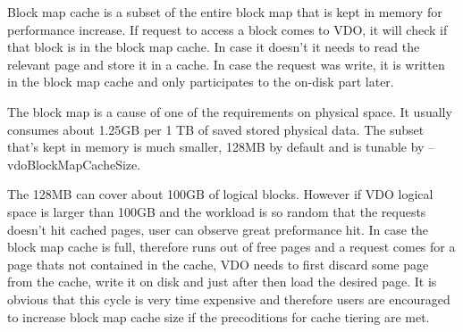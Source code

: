 \documentclass[
  color, %
  table, %
  lof,   %
  lot,   %
]{fithesis3}
\begin{document}
Block map cache is a subset of the entire block map that is kept in memory for performance increase. If request to access a block comes to VDO, it will check if that block is in the block map cache. In case it doesn't it needs to read the relevant page and store it in a cache. In case the request was write, it is written in the block map cache and only participates to the on-disk part later.

The block map is a cause of one of the requirements on physical space. It usually consumes about 1.25GB per 1 TB of saved stored physical data. The subset that's kept in memory is much smaller, 128MB by default and is tunable by --vdoBlockMapCacheSize.

The 128MB can cover about 100GB of logical blocks. However if VDO logical space is larger than 100GB and the workload is so random that the requests doesn't hit cached pages, user can observe great preformance hit. In case the block map cache is full, therefore runs out of free pages and a request comes for a page thats not contained in the cache, VDO needs to first discard some page from the cache, write it on disk and just after then load the desired page. It is obvious that this cycle is very time expensive and therefore users are encouraged to increase block map cache size if the precoditions for cache tiering are met.








\end{document}

